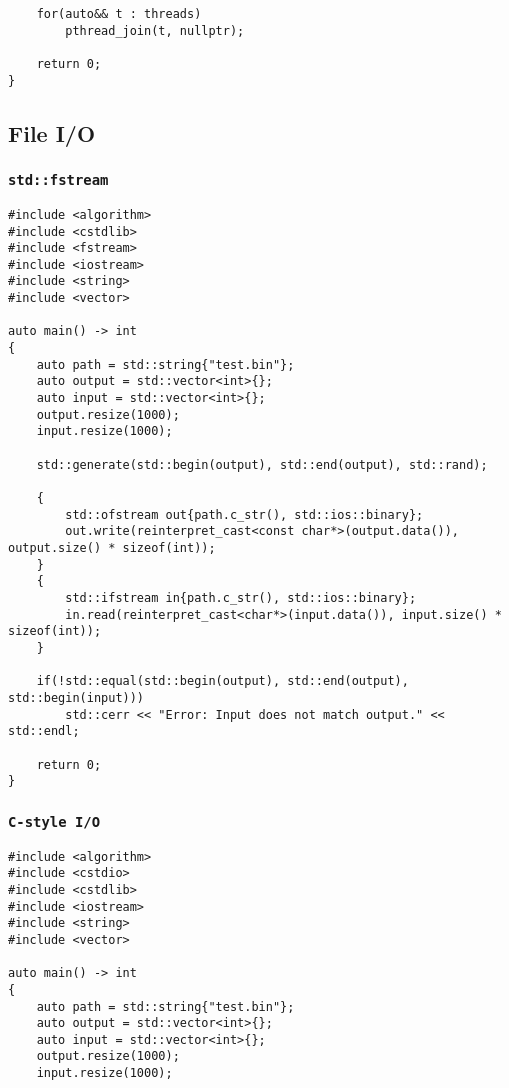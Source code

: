 \begin{appendix}
\begin{verbatim}
    for(auto&& t : threads)
        pthread_join(t, nullptr);
        
    return 0;
}
\end{verbatim}

\subsection{File I/O}

\subsubsection{\texttt{std::fstream}}\label{app:scorep_fstream}

\begin{verbatim}
#include <algorithm>
#include <cstdlib>
#include <fstream>
#include <iostream>
#include <string>
#include <vector>

auto main() -> int
{
    auto path = std::string{"test.bin"};
    auto output = std::vector<int>{};
    auto input = std::vector<int>{};
    output.resize(1000);
    input.resize(1000);
    
    std::generate(std::begin(output), std::end(output), std::rand);
    
    {
        std::ofstream out{path.c_str(), std::ios::binary};
        out.write(reinterpret_cast<const char*>(output.data()), output.size() * sizeof(int));
    }
    {
        std::ifstream in{path.c_str(), std::ios::binary};
        in.read(reinterpret_cast<char*>(input.data()), input.size() * sizeof(int));
    }
    
    if(!std::equal(std::begin(output), std::end(output), std::begin(input)))
        std::cerr << "Error: Input does not match output." << std::endl;
        
    return 0;
}
\end{verbatim}

\subsubsection{\texttt{C-style I/O}}\label{app:scorep_c_io}

\begin{verbatim}
#include <algorithm>
#include <cstdio>
#include <cstdlib>
#include <iostream>
#include <string>
#include <vector>

auto main() -> int
{
    auto path = std::string{"test.bin"};
    auto output = std::vector<int>{};
    auto input = std::vector<int>{};
    output.resize(1000);
    input.resize(1000);
    

\end{verbatim}
\end{appendix}
